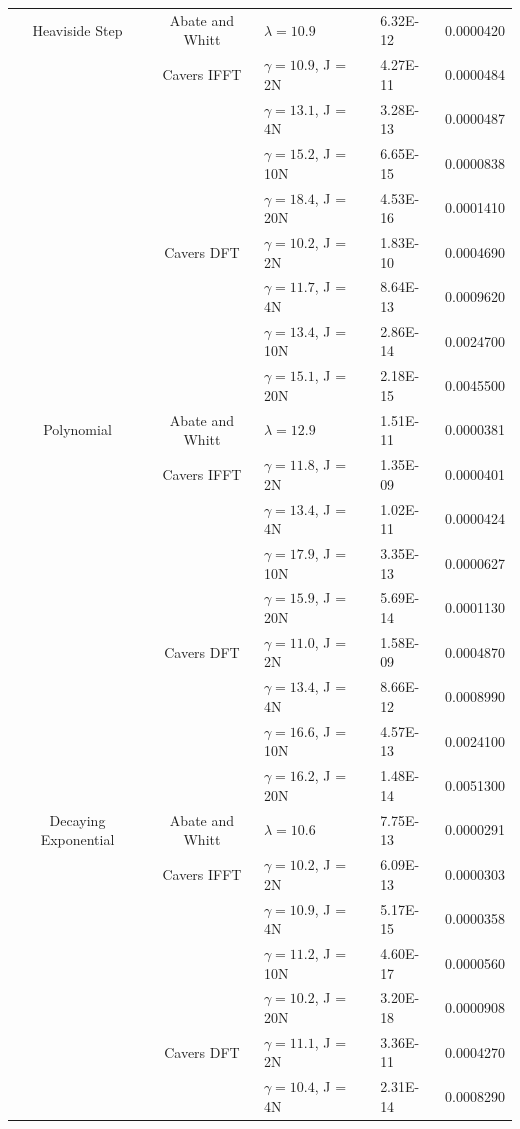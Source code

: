 \documentclass[a4paper]{report}
\begin{document}
\begin{longtable}{c|c|l|l|l}
    Heaviside Step & Abate and Whitt & $\lambda = 10.9$ & 6.32E-12 & 0.0000420 \\
    & Cavers IFFT & $\gamma = 10.9$, J = 2N & 4.27E-11 & 0.0000484 \\
    & & $\gamma = 13.1$, J = 4N & 3.28E-13 & 0.0000487 \\
    & & $\gamma = 15.2$, J = 10N & 6.65E-15 & 0.0000838 \\
    & & $\gamma = 18.4$, J = 20N & 4.53E-16 & 0.0001410 \\
    & Cavers DFT & $\gamma = 10.2$, J = 2N & 1.83E-10 & 0.0004690 \\
    & & $\gamma = 11.7$, J = 4N & 8.64E-13 & 0.0009620 \\
    & & $\gamma = 13.4$, J = 10N & 2.86E-14 & 0.0024700 \\
    & & $\gamma = 15.1$, J = 20N & 2.18E-15 & 0.0045500 \\
    \hline
    Polynomial & Abate and Whitt & $\lambda = 12.9$ & 1.51E-11 & 0.0000381 \\
    & Cavers IFFT & $\gamma = 11.8$, J = 2N & 1.35E-09 & 0.0000401 \\
    & & $\gamma = 13.4$, J = 4N & 1.02E-11 & 0.0000424 \\
    & & $\gamma = 17.9$, J = 10N & 3.35E-13 & 0.0000627 \\
    & & $\gamma = 15.9$, J = 20N & 5.69E-14 & 0.0001130 \\
    & Cavers DFT & $\gamma = 11.0$, J = 2N & 1.58E-09 & 0.0004870 \\
    & & $\gamma = 13.4$, J = 4N & 8.66E-12 & 0.0008990 \\
    & & $\gamma = 16.6$, J = 10N & 4.57E-13 & 0.0024100 \\
    & & $\gamma = 16.2$, J = 20N & 1.48E-14 & 0.0051300 \\
    \hline
    Decaying Exponential & Abate and Whitt & $\lambda = 10.6$ & 7.75E-13 & 0.0000291 \\
    & Cavers IFFT & $\gamma = 10.2$, J = 2N & 6.09E-13 & 0.0000303 \\
    & & $\gamma = 10.9$, J = 4N & 5.17E-15 & 0.0000358 \\
    & & $\gamma = 11.2$, J = 10N & 4.60E-17 & 0.0000560 \\
    & & $\gamma = 10.2$, J = 20N & 3.20E-18 & 0.0000908 \\
    & Cavers DFT & $\gamma = 11.1$, J = 2N & 3.36E-11 & 0.0004270 \\
    & & $\gamma = 10.4$, J = 4N & 2.31E-14 & 0.0008290 \\

\end{longtable}
\end{document}
